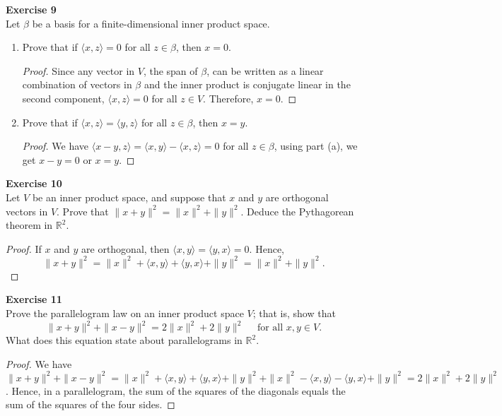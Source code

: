 \documentclass[12pt, a4paper]{article}
\theoremstyle{plain}
\newcommand{\R}{\mathbb{R}}
\newenvironment{exercise}[2][Exercise]
    { \begin{mdframed}[backgroundcolor=gray!20] \textbf{#1 #2} \\}
    {  \end{mdframed}}
\begin{document}
\begin{exercise}{9}
Let $\beta$ be a basis for a finite-dimensional inner product space.
\begin{enumerate}[label=(\alph*)]
\item Prove that if $\langle{x,z}\rangle=0$ for all $z\in\beta$, then $x=0$.
	\begin{proof}
	Since any vector in $V$, the span of $\beta$, can be written as a linear combination of vectors in $\beta$ and the inner product is conjugate linear in the second component, $\langle{x,z}\rangle=0$ for all $z\in V$. Therefore, $x=0$.
	\end{proof}
\item Prove that if $\langle{x,z}\rangle=\langle{y,z}\rangle$ for all $z\in \beta$, then $x=y$.
	\begin{proof}
	We have $\langle{x-y,z}\rangle=\langle{x,y}\rangle-\langle{x,z}\rangle=0$ for all $z\in \beta$, using part (a), we get $x-y=0$ or $x=y$.
	\end{proof}
\end{enumerate}
\end{exercise}

\begin{exercise}{10}
Let $V$ be an inner product space, and suppose that $x$ and $y$ are orthogonal vectors in $V$. Prove that $\|x+y\|^2=\|x\|^2+\|y\|^2$. Deduce the Pythagorean theorem in $\R^2$.
\end{exercise}
	\begin{proof}
	If $x$ and $y$ are orthogonal, then $\langle{x,y}\rangle=\langle{y,x}\rangle=0$. Hence, 
	\[
	\|x+y\|^2=\|x\|^2+\langle{x,y}\rangle+\langle{y,x}\rangle+\|y\|^2=\|x\|^2+\|y\|^2.
	\]
	\end{proof}

\begin{exercise}{11}
Prove the parallelogram law on an inner product space $V$; that is, show that 
\[
\|x+y\|^2+\|x-y\|^2=2\|x\|^2+2\|y\|^2\quad \text{ for all } x,y\in V.
\]
What does this equation state about parallelograms in $\R^2$.
\end{exercise}
	\begin{proof}
	We have $\|x+y\|^2+\|x-y\|^2=\|x\|^2+\langle{x,y}\rangle+\langle{y,x}\rangle+\|y\|^2+\|x\|^2-\langle{x,y}\rangle-\langle{y,x}\rangle+\|y\|^2=2\|x\|^2+2\|y\|^2$. Hence, in a parallelogram, the sum of the squares of the diagonals equals the sum of the squares of the four sides.
	\end{proof}
\end{document}
